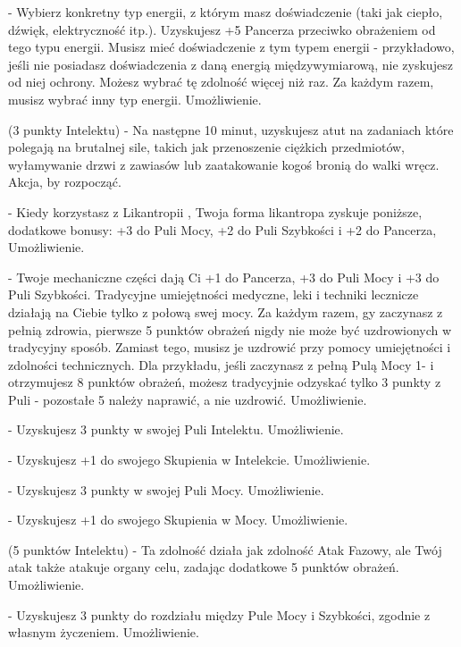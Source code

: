 { - Wybierz konkretny typ energii, z którym masz doświadczenie (taki jak ciepło, dźwięk, elektryczność itp.). Uzyskujesz +5 Pancerza przeciwko obrażeniem od tego typu energii. Musisz mieć doświadczenie z tym typem energii - przykładowo, jeśli nie posiadasz doświadczenia z daną energią międzywymiarową, nie zyskujesz od niej ochrony. Możesz wybrać tę zdolność więcej niż raz. Za każdym razem, musisz wybrać inny typ energii. Umożliwienie.

 (3 punkty Intelektu) - Na następne 10 minut, uzyskujesz atut na zadaniach które polegają na brutalnej sile, takich jak przenoszenie ciężkich przedmiotów, wyłamywanie drzwi z zawiasów lub zaatakowanie kogoś bronią do walki wręcz. Akcja, by rozpocząć. 

 - Kiedy korzystasz z Likantropii , Twoja forma likantropa zyskuje poniższe, dodatkowe bonusy: +3 do Puli Mocy, +2 do Puli Szybkości i +2 do Pancerza, Umożliwienie.

 - Twoje mechaniczne części dają Ci +1 do Pancerza, +3 do Puli Mocy i +3 do Puli Szybkości. Tradycyjne umiejętności medyczne, leki i techniki lecznicze działają na Ciebie tylko z połową swej mocy. Za każdym razem, gy zaczynasz z pełnią zdrowia, pierwsze 5 punktów obrażeń nigdy nie może być uzdrowionych w tradycyjny sposób. Zamiast tego, musisz je uzdrowić przy pomocy umiejętności i zdolności technicznych. Dla przykładu, jeśli zaczynasz z pełną Pulą Mocy 1- i otrzymujesz 8 punktów obrażeń, możesz tradycyjnie odzyskać tylko 3 punkty z Puli - pozostałe 5 należy naprawić, a nie uzdrowić. Umożliwienie.

 - Uzyskujesz 3 punkty w swojej Puli Intelektu. Umożliwienie.

 - Uzyskujesz +1 do swojego Skupienia w Intelekcie. Umożliwienie.

 - Uzyskujesz 3 punkty w swojej Puli Mocy. Umożliwienie.

 - Uzyskujesz +1 do swojego Skupienia w Mocy. Umożliwienie.

 (5 punktów Intelektu) - Ta zdolność działa jak zdolność Atak Fazowy, ale Twój atak także atakuje organy celu, zadając dodatkowe 5 punktów obrażeń. Umożliwienie.

 - Uzyskujesz 3 punkty do rozdziału między Pule Mocy i Szybkości, zgodnie z własnym życzeniem. Umożliwienie.

}
